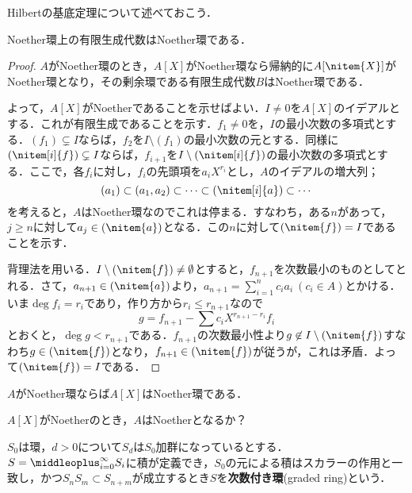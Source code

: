 Hilbertの基底定理について述べておこう．
\begin{thm}[Hilbertの基底定理]\label{thm:Hilbertの基底定理}
	Noether環上の有限生成代数はNoether環である．
\end{thm}
\begin{proof}
	$A$がNoether環のとき，$A[X]$がNoether環なら帰納的に$A[\nitem{X}]$がNoether環となり，その剰余環である有限生成代数$B$はNoether環である．
	
	よって，$A[X]$がNoetherであることを示せばよい．$I\neq0$を$A[X]$のイデアルとする．これが有限生成であることを示す．$f_1\neq0$を，$I$の最小次数の多項式とする．$(f_1)\subsetneq I$ならば，$f_2$を$I\setminus(f_1)$の最小次数の元とする．同様に$(\nitem[i]{f})\subsetneq I$ならば，$f_{i+1}$を$I\setminus(\nitem[i]{f})$の最小次数の多項式とする．ここで，各$f_i$に対し，$f_i$の先頭項を$a_iX^{r_i}$とし，$A$のイデアルの増大列；
	\[(a_1)\subset(a_1,a_2)\subset\dots\subset(\nitem[i]{a})\subset\cdots\]
	を考えると，$A$はNoether環なのでこれは停まる．すなわち，ある$n$があって，$j\geq n$に対して$a_j\in(\nitem{a})$となる．この$n$に対して$(\nitem{f})=I$であることを示す．
	
	背理法を用いる．$I\setminus(\nitem{f})\neq\emptyset$とすると，$f_{n+1}$を次数最小のものとしてとれる．さて，$a_{n+1}\in(\nitem{a})$より，$a_{n+1}=\sum_{i=1}^n c_ia_i~(c_i\in A)$とかける．いま$\deg{f_i}=r_i$であり，作り方から$r_i\leq r_{n+1}$なので
	\[g=f_{n+1}-\sum c_iX^{r_{n+1}-r_i}f_i\]
	とおくと，$\deg g<r_{n+1}$である．$f_{n+1}$の次数最小性より$g\not\in I\setminus(\nitem{f})$すなわち$g\in(\nitem{f})$となり，$f_{n+1}\in(\nitem{f})$が従うが，これは矛盾．よって$(\nitem{f})=I$である．
\end{proof}

\begin{cor}
	$A$がNoether環ならば$A[X]$はNoether環である．
\end{cor}

\begin{exer}
	$A[X]$がNoetherのとき，$A$はNoetherとなるか？
\end{exer}

\begin{defi}[次数付き環]
	$S_0$は環，$d>0$について$S_d$は$S_0$加群になっているとする．$S=\middleoplus_{i=0}^\infty S_i$に積が定義でき，$S_0$の元による積はスカラーの作用と一致し，かつ$S_nS_m\subset S_{n+m}$が成立するとき$S$を\textbf{次数付き環}(graded ring)という．
\end{defi}

